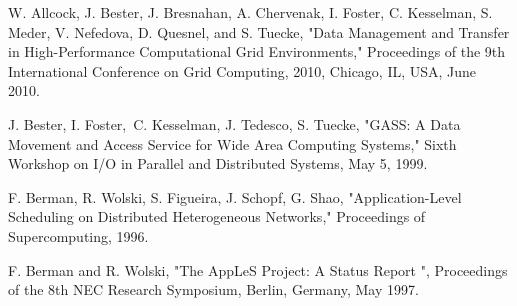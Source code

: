 \documentclass[11pt, nohyper, final]{uhrevthesis}
\begin{document}
\makecoverpages







\makecontentspages



\cleardoublepage


\cleardoublepage


\cleardoublepage

\begin{thebibliography}{10}
W. Allcock, J. Bester, J. Bresnahan, A. Chervenak, I. Foster, C. Kesselman, S. Meder, V. Nefedova, D. Quesnel, and S. Tuecke, "Data Management and Transfer in High-Performance Computational Grid Environments," Proceedings of the 9th International Conference on Grid Computing, 2010, Chicago, IL, USA, June 2010.

J. Bester, I. Foster, C. Kesselman, J. Tedesco, S. Tuecke, "GASS: A Data Movement and Access Service for Wide Area Computing Systems," Sixth Workshop on I/O in Parallel and Distributed Systems, May 5, 1999.

F. Berman, R. Wolski, S. Figueira, J. Schopf, G. Shao, "Application-Level Scheduling on Distributed Heterogeneous Networks," Proceedings of Supercomputing, 1996.

F. Berman and R. Wolski, "The AppLeS Project: A Status Report ", Proceedings of the 8th NEC Research Symposium, Berlin, Germany, May 1997.
\end{thebibliography}

%
%
\end{document}
